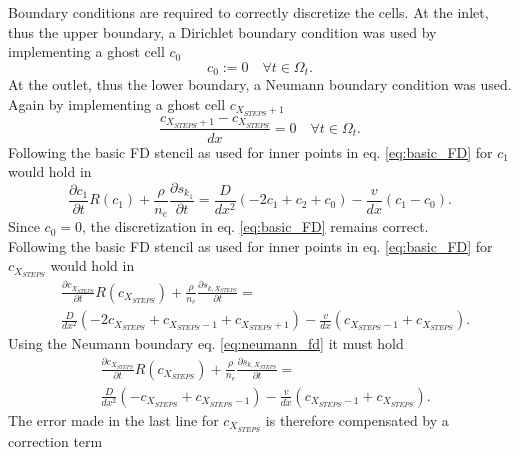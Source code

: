 Boundary conditions are required to correctly discretize the cells. At the inlet, thus the upper boundary, a Dirichlet boundary condition was used by implementing a ghost cell $c_0$
\begin{equation}
    c_0 := 0 \quad \forall t \in \Omega_t.
    \label{eq:dirichlet_fd}
\end{equation}
At the outlet, thus the lower boundary, a Neumann boundary condition was used. Again by implementing a ghost cell $c_{X_{STEPS}+1}$
\begin{equation}
    \frac{c_{X_{STEPS}+1} - c_{X_{STEPS}}}{dx} = 0 \quad \forall t \in \Omega_t.
    \label{eq:neumann_fd}
\end{equation}
Following the basic FD stencil as used for inner points in eq. \ref{eq:basic_FD} for $c_1$ would hold in
\begin{equation}
    \frac{\partial c_1}{\partial t} R(c_1) + \frac{\rho}{n_e} \frac{\partial s_{k_1}}{\partial t} = \frac{D}{dx^2} (-2c_1 + c_2 + c_0) - \frac{v}{dx}(c_1 -c_0).
\end{equation}
Since $c_0 = 0$, the discretization in eq. \ref{eq:basic_FD} remains correct.\\
Following the basic FD stencil as used for inner points in eq. \ref{eq:basic_FD} for $c_{X_{STEPS}}$ would hold in
\begin{align}
    &\frac{\partial c_{X_{STEPS}}}{\partial t} R(c_{X_{STEPS}}) + \frac{\rho}{n_e} \frac{\partial s_{k,X_{STEPS}}}{\partial t} = \nonumber\\ &\frac{D}{dx^2} (-2c_{X_{STEPS}} + c_{X_{STEPS}-1} + c_{X_{STEPS}+1}) -  \frac{v}{dx}(c_{X_{STEPS}-1} + c_{X_{STEPS}}).
\end{align}
Using the Neumann boundary eq. \ref{eq:neumann_fd} it must hold
\begin{align}
    &\frac{\partial c_{X_{STEPS}}}{\partial t} R(c_{X_{STEPS}}) + \frac{\rho}{n_e} \frac{\partial s_{k, X_{STEPS}}}{\partial t} = \nonumber\\ &\frac{D}{dx^2} (-c_{X_{STEPS}} + c_{X_{STEPS}-1}) - \frac{v}{dx}(c_{X_{STEPS}-1} + c_{X_{STEPS}}).
\end{align}
The error made in the last line for $c_{X_{STEPS}}$ is therefore compensated by a correction term

